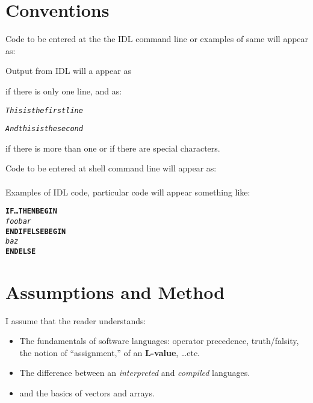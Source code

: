 \section{Conventions}\label{sec:Conventions}

    Code to be entered at the the IDL command line or examples of same will
    appear as:


    Output from IDL will a appear as 


    if there is only one line, and as:


     \begin{alltt}

       \textit{This is the first line}

       \textit{And this is the second}

    \end{alltt}

    if there is more than one or if there are special characters.


    Code to be entered at shell command line will appear as:\\

    \\

    Examples of IDL code, particular  code will appear
    something like:


\begin{alltt}

    \textbf{IF \ldots THEN BEGIN}
      \textit{foo bar}
    \textbf{ENDIF ELSE BEGIN}
      \textit{ baz }
    \textbf{ENDELSE}

\end{alltt}

\section{Assumptions and Method}\label{sec:Assumptions}

    I assume that the reader understands:
    \begin{itemize}
        \item The fundamentals of software languages: operator
         precedence, truth/falsity, the notion of ``assignment,'' 
         of an \textbf{L-value}, \ldots etc.

        \item The difference between an \textit{interpreted} and
              \textit{compiled} languages.
         \item and the basics of vectors and arrays.
    \end{itemize}

